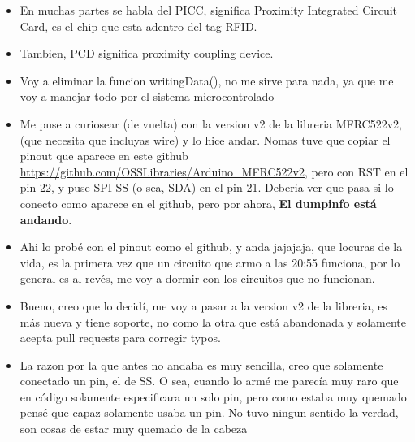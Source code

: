 \documentclass[../informe_krapp.tex]{subfiles}
\begin{document}
\begin{itemize}
	\item En muchas partes se habla del PICC, significa
	      Proximity Integrated Circuit Card, es el chip que esta adentro del tag RFID.

	\item Tambien, PCD significa proximity coupling device.

	\item Voy a eliminar la funcion writingData(), no me sirve para nada, ya que
	      me voy a manejar todo por el sistema microcontrolado

	\item Me puse a curiosear (de vuelta) con la version v2 de la libreria
	      MFRC522v2, (que necesita que incluyas wire)
	      y lo hice andar. Nomas tuve que copiar el pinout que aparece en este github
	      \url{https://github.com/OSSLibraries/Arduino_MFRC522v2}, pero con RST en el
	      pin 22, y puse SPI SS (o sea, SDA) en el pin 21. Deberia ver que pasa si
	      lo conecto como aparece en el github, pero por ahora,
	      \textbf{El dumpinfo está andando}.

	\item Ahi lo probé con el pinout como el github,
	      y anda jajajaja, que locuras de la vida,
	      es la primera vez que un circuito que armo a las 20:55 funciona,
	      por lo general es al revés, me voy a dormir con los circuitos que no funcionan.

	\item Bueno, creo que lo decidí, me voy a pasar a la version v2 de la libreria,
	      es más nueva y tiene soporte, no como la otra que está abandonada y solamente
	      acepta pull requests para corregir typos.

	\item La razon por la que antes no andaba es muy sencilla, creo que solamente
	      conectado un pin, el de SS. O sea, cuando lo armé me parecía muy raro que en código
	      solamente especificara un solo pin, pero como estaba muy quemado pensé que capaz
	      solamente usaba un pin. No tuvo ningun sentido la verdad, son cosas de estar muy
	      quemado de la cabeza



\end{itemize}
\end{document}
